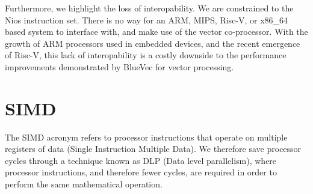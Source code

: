 \documentclass[a4paper,8pt]{report}
\begin{document}

Furthermore, we highlight the loss of interopability. We are constrained to the
Nios instruction set. There is no way for an ARM, MIPS, Risc-V, or x86\_64 based
system to interface with, and make use of the vector co-processor. With the
growth of ARM processors used in embedded devices, and the recent emergence of
Risc-V, this lack of interopability is a costly downside to the performance
improvements demonstrated by BlueVec for vector processing.










\section{SIMD}
The SIMD acronym refers to processor instructions that operate on multiple
registers of data (Single Instruction Multiple Data). We therefore save
processor cycles through a technique known as DLP (Data level parallelism),
where processor instructions, and therefore fewer cycles, are required in order
to perform the same mathematical operation.
\end{document}
